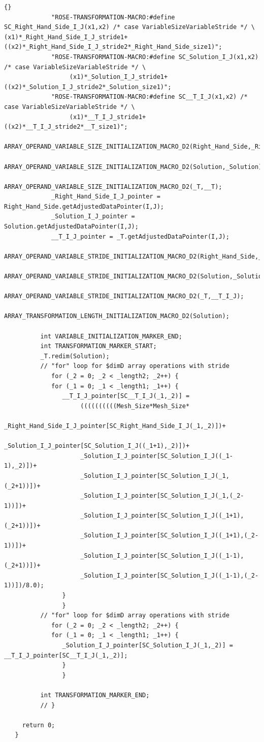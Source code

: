 \documentclass[10pt]{article}
\begin{document}
{\begin{lstlisting}{}
             "ROSE-TRANSFORMATION-MACRO:#define SC_Right_Hand_Side_I_J(x1,x2) /* case VariableSizeVariableStride */ \                  (x1)*_Right_Hand_Side_I_J_stride1+((x2)*_Right_Hand_Side_I_J_stride2*_Right_Hand_Side_size1)"; 
             "ROSE-TRANSFORMATION-MACRO:#define SC_Solution_I_J(x1,x2) /* case VariableSizeVariableStride */ \
                  (x1)*_Solution_I_J_stride1+((x2)*_Solution_I_J_stride2*_Solution_size1)"; 
             "ROSE-TRANSFORMATION-MACRO:#define SC__T_I_J(x1,x2) /* case VariableSizeVariableStride */ \
                  (x1)*__T_I_J_stride1+((x2)*__T_I_J_stride2*__T_size1)"; 
             ARRAY_OPERAND_VARIABLE_SIZE_INITIALIZATION_MACRO_D2(Right_Hand_Side,_Right_Hand_Side);
             ARRAY_OPERAND_VARIABLE_SIZE_INITIALIZATION_MACRO_D2(Solution,_Solution);
             ARRAY_OPERAND_VARIABLE_SIZE_INITIALIZATION_MACRO_D2(_T,__T);
             _Right_Hand_Side_I_J_pointer = Right_Hand_Side.getAdjustedDataPointer(I,J); 
             _Solution_I_J_pointer = Solution.getAdjustedDataPointer(I,J); 
             __T_I_J_pointer = _T.getAdjustedDataPointer(I,J); 
          ARRAY_OPERAND_VARIABLE_STRIDE_INITIALIZATION_MACRO_D2(Right_Hand_Side,_Right_Hand_Side_I_J);
          ARRAY_OPERAND_VARIABLE_STRIDE_INITIALIZATION_MACRO_D2(Solution,_Solution_I_J);
          ARRAY_OPERAND_VARIABLE_STRIDE_INITIALIZATION_MACRO_D2(_T,__T_I_J);
          ARRAY_TRANSFORMATION_LENGTH_INITIALIZATION_MACRO_D2(Solution);
           
          int VARIABLE_INITIALIZATION_MARKER_END; 
          int TRANSFORMATION_MARKER_START; 
          _T.redim(Solution);
          // "for" loop for $dimD array operations with stride 
             for (_2 = 0; _2 < _length2; _2++) { 
             for (_1 = 0; _1 < _length1; _1++) { 
                __T_I_J_pointer[SC__T_I_J(_1,_2)] = 
                     ((((((((((Mesh_Size*Mesh_Size*
                     _Right_Hand_Side_I_J_pointer[SC_Right_Hand_Side_I_J(_1,_2)])+
                     _Solution_I_J_pointer[SC_Solution_I_J((_1+1),_2)])+
                     _Solution_I_J_pointer[SC_Solution_I_J((_1-1),_2)])+
                     _Solution_I_J_pointer[SC_Solution_I_J(_1,(_2+1))])+
                     _Solution_I_J_pointer[SC_Solution_I_J(_1,(_2-1))])+
                     _Solution_I_J_pointer[SC_Solution_I_J((_1+1),(_2+1))])+
                     _Solution_I_J_pointer[SC_Solution_I_J((_1+1),(_2-1))])+
                     _Solution_I_J_pointer[SC_Solution_I_J((_1-1),(_2+1))])+
                     _Solution_I_J_pointer[SC_Solution_I_J((_1-1),(_2-1))])/8.0); 
                } 
                } 
          // "for" loop for $dimD array operations with stride 
             for (_2 = 0; _2 < _length2; _2++) { 
             for (_1 = 0; _1 < _length1; _1++) { 
                _Solution_I_J_pointer[SC_Solution_I_J(_1,_2)] = __T_I_J_pointer[SC__T_I_J(_1,_2)]; 
                } 
                } 
           
          int TRANSFORMATION_MARKER_END; 
          // }
           
     return 0;
   }

\end{lstlisting}
}
\end{document}

